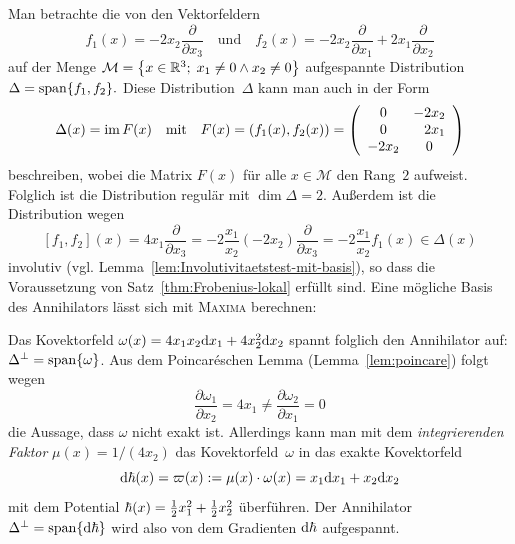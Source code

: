 \begin{example}
\label{exa:Frobenius1}Man betrachte die von den Vektorfeldern 
\[
f_{1}(x)=-2x_{2}\frac{\partial}{\partial x_{3}}\quad\text{und}\quad f_{2}(x)=-2x_{2}\frac{\partial}{\partial x_{1}}+2x_{1}\frac{\partial}{\partial x_{2}}
\]
auf der Menge $\mathcal{M}=\left\{ x\in{\mathbb{R}}^{3};\;x_{1}\neq0\wedge x_{2}\neq0\right\} $
aufgespannte Distribution $\Delta={\operatorname{span}}\{f_{1},f_{2}\}.$ Diese Distribution~$\Delta$
kann man auch in der Form 
\[
\Delta(x)=\im\,F(x)\quad\text{mit}\quad F(x)=\left(f_{1}(x),f_{2}(x)\right)=\left(\begin{array}{cc}
0 & -2x_{2}\\
0 & \phantom{{-}}2x_{1}\\
-2x_{2} & 0
\end{array}\right)
\]
beschreiben, wobei die Matrix $F(x)$ für alle $x\in\mathcal{M}$
den Rang~$2$ aufweist. Folglich ist die Distribution regulär mit
$\dim\Delta=2$. Außerdem ist die Distribution wegen 
\[
[f_{1},f_{2}](x)=4x_{1}\frac{\partial}{\partial x_{3}}=-2\frac{x_{1}}{x_{2}}(-2x_{2})\frac{\partial}{\partial x_{3}}=-2\frac{x_{1}}{x_{2}}f_{1}(x)\in\Delta(x)
\]
involutiv (vgl. Lemma~\ref{lem:Involutivitaetstest-mit-basis}),
so dass die Voraussetzung von Satz~\ref{thm:Frobenius-lokal} erfüllt
sind. Eine mögliche Basis des Annihilators lässt sich mit \textsc{Maxima}
berechnen:

\begin{maxima}\end{maxima}

Das Kovektorfeld $\omega(x)=4x_{1}x_{2}{\mathrm{d}} x_{1}+4x_{2}^{2}{\mathrm{d}} x_{2}$
spannt folglich den Annihilator auf: $\Delta^{\perp}={\operatorname{span}}\{\omega\}$.
Aus dem Poincaréschen Lemma (Lemma~\ref{lem:poincare}) folgt wegen
\[
\frac{\partial\omega_{1}}{\partial x_{2}}=4x_{1}\neq\frac{\partial\omega_{2}}{\partial x_{1}}=0
\]
die Aussage, dass $\omega$ nicht exakt ist. Allerdings kann man mit
dem \emph{integrierenden Faktor} $\mu(x)=1/(4x_{2})$
das Kovektorfeld~$\omega$ in das exakte Kovektorfeld 
\[
\mathrm{d}\hbar(x)=\varpi(x):=\mu(x)\cdot\omega(x)=x_{1}\mathrm{d} x_{1}+x_{2}\mathrm{d} x_{2}
\]
mit dem Potential $\hbar(x)=\tfrac{1}{2} x_{1}^{2}+\tfrac{1}{2} x_{2}^{2}$ überführen.
Der Annihilator $\Delta^{\perp}={\operatorname{span}}\{\mathrm{d}\hbar\}$ wird also von
dem Gradienten $\mathrm{d}\hbar$ aufgespannt.
\end{example}

